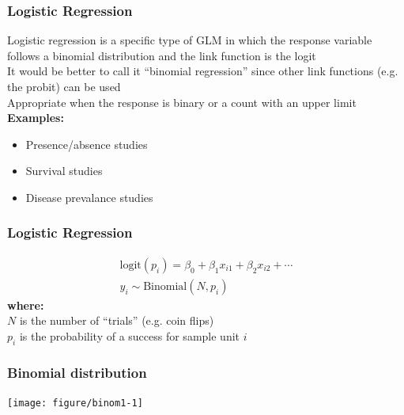 \documentclass[color=usenames,dvipsnames]{beamer}\usepackage[]{graphicx}\usepackage[]{color}
\newenvironment{knitrout}{}{} %
\begin{document}
\begin{frame}
  \frametitle{Logistic Regression}
  Logistic regression is a specific type of GLM in which the
      response variable follows a binomial distribution and the link
      function is the logit \\
  \pause
  \vfill
  It would be better to call it ``binomial regression'' since other
      link functions (e.g. the probit) can be used \\
  \pause
  \vfill
  Appropriate when the response is binary or a count with an
  upper limit
  \pause
  \vfill
  {\bf Examples:}
      \begin{itemize}
        \normalsize
        \item Presence/absence studies
        \item Survival studies
        \item Disease prevalance studies
      \end{itemize}
\end{frame}


\begin{frame}
  \frametitle{Logistic Regression}
    \begin{gather*}
      \mathrm{logit}(p_i) = \beta_0 + \beta_1 x_{i1} + \beta_2 x_{i2} + \cdots \\
      y_i \sim \mathrm{Binomial}(N, p_i)
  \end{gather*}
  \pause
  {\bf where: \\}
  $N$ is the number of ``trials'' (e.g. coin flips) \\
  $p_i$ is the probability of a success for sample unit $i$
\end{frame}



\begin{frame}[fragile]
  \frametitle{Binomial distribution}%
  \vspace{-0.4cm}
\begin{center}
\begin{knitrout}
\color{fgcolor}
\texttt{[image: figure/binom1-1]} 

\end{knitrout}
\end{center}
\vfill
\end{frame}
\end{document}
